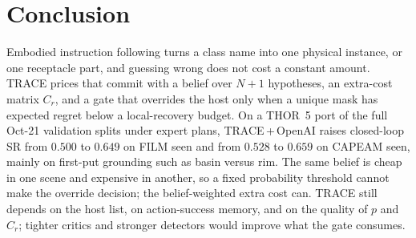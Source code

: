 \documentclass[conference]{IEEEtran}
\begin{document}
\section{Conclusion}
Embodied instruction following turns a class name into one physical instance, or one receptacle part, and guessing wrong does not cost a constant amount.
TRACE prices that commit with a belief over $N{+}1$ hypotheses, an extra-cost matrix $C_r$, and a gate that overrides the host only when a unique mask has expected regret below a local-recovery budget.
On a THOR~5 port of the full Oct-21 validation splits under expert plans, TRACE\,+\,OpenAI raises closed-loop SR from $0.500$ to $0.649$ on FILM seen and from $0.528$ to $0.659$ on CAPEAM seen, mainly on first-put grounding such as basin versus rim. %
The same belief is cheap in one scene and expensive in another, so a fixed probability threshold cannot make the override decision; the belief-weighted extra cost can.
TRACE still depends on the host list, on action-success memory, and on the quality of $p$ and $C_r$; tighter critics and stronger detectors would improve what the gate consumes.



\end{document}
